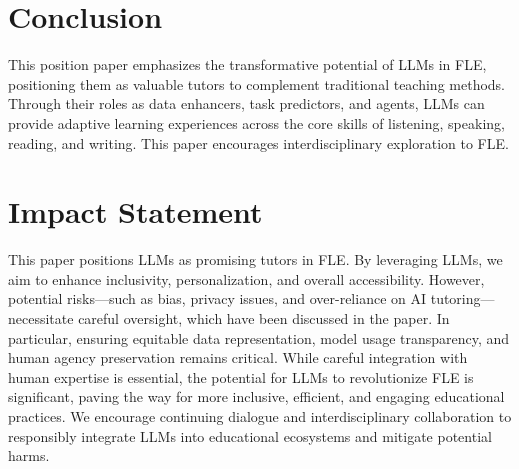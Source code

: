 \section{Conclusion}
This position paper emphasizes the transformative potential of LLMs in FLE, positioning them as valuable tutors to complement traditional teaching methods. Through their roles as data enhancers, task predictors, and agents, LLMs can provide adaptive learning experiences across the core skills of listening, speaking, reading, and writing. This paper encourages interdisciplinary exploration to FLE.



\section*{Impact Statement}
This paper positions LLMs as promising tutors in FLE. By leveraging LLMs, we aim to enhance inclusivity, personalization, and overall accessibility. However, potential risks—such as bias, privacy issues, and over-reliance on AI tutoring—necessitate careful oversight, which have been discussed in the paper. In particular, ensuring equitable data representation, model usage transparency, and human agency preservation remains critical. While careful integration with human expertise is essential, the potential for LLMs to revolutionize FLE is significant, paving the way for more inclusive, efficient, and engaging educational practices. We encourage continuing dialogue and interdisciplinary collaboration to responsibly integrate LLMs into educational ecosystems and mitigate potential harms.
